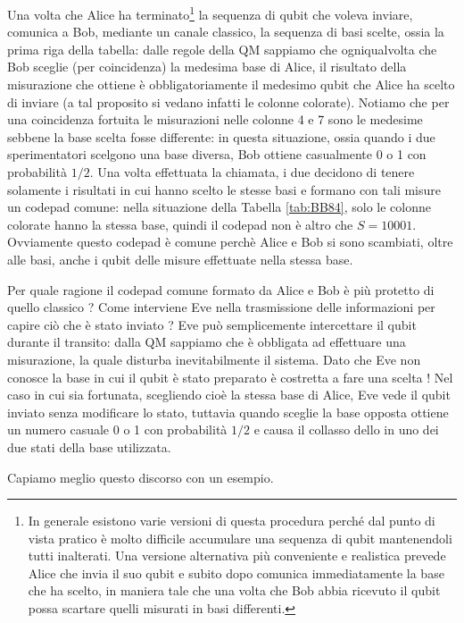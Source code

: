 \begin{esempio}
\noindent Una volta che Alice ha terminato\footnote{In generale esistono varie versioni di questa procedura perché dal punto di vista pratico è molto difficile accumulare una sequenza di qubit mantenendoli tutti inalterati. Una versione alternativa più conveniente e realistica prevede Alice che invia il suo qubit e subito dopo comunica immediatamente la base che ha scelto, in maniera tale che una volta che Bob abbia ricevuto il qubit possa scartare quelli misurati in basi differenti.} la sequenza di qubit che voleva inviare, comunica a Bob, mediante un canale classico, la sequenza di basi scelte, ossia la prima riga della tabella: dalle regole della QM sappiamo che ogniqualvolta che Bob sceglie (per coincidenza) la medesima base di Alice, il risultato della misurazione che ottiene è obbligatoriamente il medesimo qubit che Alice ha scelto di inviare (a tal proposito si vedano infatti le colonne colorate). Notiamo che per una coincidenza fortuita le misurazioni nelle colonne 4 e 7 sono le medesime sebbene la base scelta fosse differente: in questa situazione, ossia quando i due sperimentatori scelgono una base diversa, Bob ottiene casualmente 0 o 1 con probabilità $1/2$. Una volta effettuata la chiamata, i due decidono di tenere solamente i risultati in cui hanno scelto le stesse basi e formano con tali misure un codepad comune: nella situazione della Tabella \ref{tab:BB84}, solo le colonne colorate hanno la stessa base, quindi il codepad non è altro che $S = 10001$. Ovviamente questo codepad è comune perchè Alice e Bob si sono scambiati, oltre alle basi, anche i qubit delle misure effettuate nella stessa base.
\end{esempio}

\noindent Per quale ragione il codepad comune formato da Alice e Bob è più protetto di quello classico ? Come interviene Eve nella trasmissione delle informazioni per capire ciò che è stato inviato ? Eve può semplicemente intercettare il qubit durante il transito: dalla QM sappiamo che è obbligata ad effettuare una misurazione, la quale disturba inevitabilmente il sistema. Dato che Eve non conosce la base in cui il qubit è stato preparato è costretta a fare una scelta ! Nel caso in cui sia fortunata, scegliendo cioè la stessa base di Alice, Eve vede il qubit inviato senza modificare lo stato, tuttavia quando sceglie la base opposta ottiene un numero casuale 0 o 1 con probabilità $1/2$ e causa il collasso dello in uno dei due stati della base utilizzata. 

\noindent Capiamo meglio questo discorso con un esempio.

